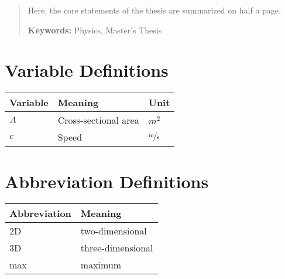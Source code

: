 \documentclass[master,
               twoside,
               BCOR10mm,
               english,english,
               english,english
               final,
               ]{GAUBM}
\newcommand{\tabheadfont}[1]{\textbf{#1}}
\begin{document}




\frontmatter
\maketitle
\cleardoublepage



\begin{abstract}
  Here, the core statements of the thesis are summarized on half a page.
  \bigskip\par
  \textbf{Keywords:} Physics, Master's Thesis
\end{abstract}

\cleardoublepage
\onehalfspacing

\tableofcontents

\begin{nomenclature}

\section*{Variable Definitions}
\noindent
\begin{longtable}[l]{p{}p{}p{}}
  \tabheadfont{Variable}&\tabheadfont{Meaning}&\tabheadfont{Unit}\\\midrule\endhead
  $A$ & Cross-sectional area & $\unit{m^2}$\\
  $c$ & Speed & $\unitfrac{m}{s}$
\end{longtable}

\section*{Abbreviation Definitions}
\begin{longtable}[l]{p{}p{}}
  \tabheadfont{Abbreviation}&\tabheadfont{Meaning}\\\midrule\endhead
  2D & two-dimensional\\
  3D & three-dimensional\\
  max & maximum
\end{longtable}
\end{nomenclature}
\end{document}

